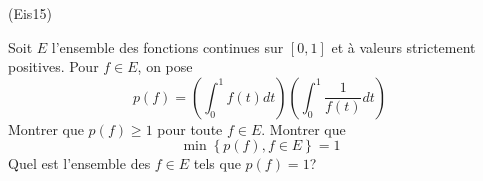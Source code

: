 \begin{tiny}(Eis15)\end{tiny} Soit $E$ l'ensemble des fonctions continues sur $\left[ 0,1\right]$ et {\`a} valeurs strictement positives. Pour $f\in E$, on pose
\begin{displaymath}
p(f)=\left(\int_{0}^{1}f(t)dt\right) \left(\int_{0}^{1}\frac{1}{f(t)}dt\right) 
\end{displaymath}
Montrer que $p(f)\geq1$ pour toute $f\in E$. Montrer que
\begin{displaymath}
 \min\left\lbrace p(f), f\in E\right\rbrace = 1 
\end{displaymath}
Quel est l'ensemble des $f\in E$ tels que $p(f)=1$?
 